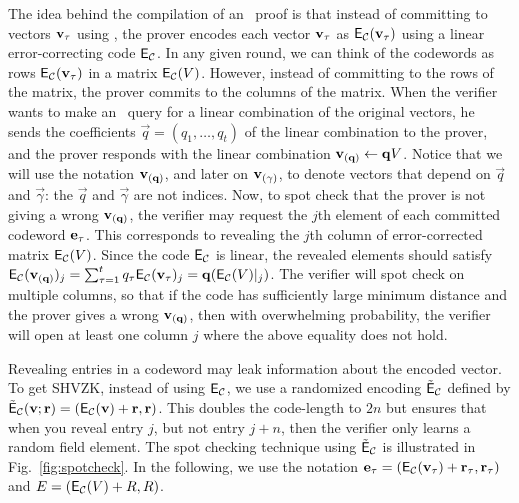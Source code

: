 The idea behind the compilation of an \ILC\ proof is that instead of committing to vectors ${\mathbf{v}}_\tau$ using \ILCcommit, the prover encodes each vector ${\mathbf{v}}_\tau$ as $\mathsf{E}_{\mathcal{C}}({\mathbf{v}}_\tau)$ using a linear error-correcting code $\mathsf{E}_{\mathcal{C}}$. In any given round, we can think of the codewords as rows $\mathsf{E}_{\mathcal{C}}({\mathbf{v}}_\tau)$ in a matrix $\mathsf{E}_{\mathcal{C}}(V)$. However, instead of committing to the rows of the matrix, the prover commits to the columns of the matrix. When the verifier wants to make an \ILCopen\ query for a linear combination of the original vectors, he sends the coefficients $\vec{q}=(q_1,\ldots,q_t)$ of the linear combination to the prover, and the prover responds with the linear combination ${\mathbf{v}}_{(\mathbf{q})}\gets \mathbf{q} V$. 
Notice that we will use the notation ${\mathbf{v}}_{(\mathbf{q})}$, and later on ${\mathbf{v}}_{(\mathbf{\gamma})}$, to denote vectors that depend on $\vec{q}$ and $\vec{\gamma}$: the $\vec{q}$ and $\vec{\gamma}$ are not indices. 
Now, to spot check that the prover is not giving a wrong ${\mathbf{v}}_{(\mathbf{q})}$, the verifier may request the $j$th element of each committed codeword $\mathbf{e}_\tau$. This corresponds to revealing the $j$th column of error-corrected matrix $\mathsf{E}_{\mathcal{C}}(V)$. Since the code $\mathsf{E}_{\mathcal{C}}$ is linear, the revealed elements should satisfy $\mathsf{E}_{\mathcal{C}}({\mathbf{v}}_{(\mathbf{q})})_j=\sum_{\tau=1}^tq_\tau \mathsf{E}_{\mathcal{C}}(\mathbf{v}_\tau)_{j}=\mathbf{q} (\mathsf{E}_{\mathcal{C}}(V)|_{j})$. The verifier will spot check on multiple columns, so that if the code has sufficiently large minimum distance and the prover gives a wrong ${\mathbf{v}}_{(\mathbf{q})}$, then with overwhelming probability, the verifier will  open at least one column $j$ where the above equality does not hold.

Revealing entries in a codeword may leak information about the encoded vector. To get SHVZK, instead of using $\mathsf{E}_{\mathcal{C}}$, we use a randomized encoding $\tilde{\mathsf{E}}_{\mathcal{C}}$ defined by $\tilde{\mathsf{E}}_{\mathcal{C}}({\mathbf{v}};\mathbf{r})=(\mathsf{E}_{\mathcal{C}}({\mathbf{v}})+\mathbf{r},\mathbf{r})$. This doubles the code-length to $2n$ but ensures that when you reveal entry $j$, but not entry $j+n$, then the verifier only learns a random field element. The spot checking technique using $\tilde{\mathsf{E}}_{\mathcal{C}}$ is illustrated in Fig.~\ref{fig:spotcheck}. In the following, we use the notation $\mathbf{e}_\tau=(\mathsf{E}_{\mathcal{C}}({\mathbf{v}}_\tau)+\mathbf{r}_\tau,\mathbf{r}_\tau)$ and $E=(\mathsf{E}_{\mathcal{C}}(V)+R,R)$.

